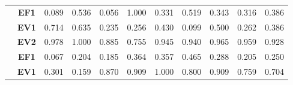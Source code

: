 \begin{table}[htbp]
\begin{tabular}{|cclllllllll|}
		\rowcolor[HTML]{F2F2F2} 
		\multicolumn{1}{|c|}{\cellcolor[HTML]{F2F2F2}} & \multicolumn{1}{c|}{\cellcolor[HTML]{F2F2F2}\textbf{EF1}} & \multicolumn{1}{l|}{\cellcolor[HTML]{F2F2F2}0.089} & \multicolumn{1}{l|}{\cellcolor[HTML]{F2F2F2}0.536} & \multicolumn{1}{l|}{\cellcolor[HTML]{F2F2F2}0.056} & \multicolumn{1}{l|}{\cellcolor[HTML]{F2F2F2}1.000} & \multicolumn{1}{l|}{\cellcolor[HTML]{F2F2F2}0.331} & \multicolumn{1}{l|}{\cellcolor[HTML]{F2F2F2}0.519} & \multicolumn{1}{l|}{\cellcolor[HTML]{F2F2F2}0.343} & \multicolumn{1}{l|}{\cellcolor[HTML]{F2F2F2}0.316} & 0.386 \\ \cline{2-11} 
		\multicolumn{1}{|c|}{\cellcolor[HTML]{F2F2F2}} & \multicolumn{1}{c|}{\textbf{EV1}} & \multicolumn{1}{l|}{0.714} & \multicolumn{1}{l|}{0.635} & \multicolumn{1}{l|}{0.235} & \multicolumn{1}{l|}{0.256} & \multicolumn{1}{l|}{0.430} & \multicolumn{1}{l|}{0.099} & \multicolumn{1}{l|}{0.500} & \multicolumn{1}{l|}{0.262} & 0.386 \\ \cline{2-11} 
		\rowcolor[HTML]{F2F2F2} 
		\multicolumn{1}{|c|}{\multirow{-3}{*}{\cellcolor[HTML]{F2F2F2}\textbf{B03}}} & \multicolumn{1}{c|}{\cellcolor[HTML]{F2F2F2}\textbf{EV2}} & \multicolumn{1}{l|}{\cellcolor[HTML]{F2F2F2}0.978} & \multicolumn{1}{l|}{\cellcolor[HTML]{F2F2F2}1.000} & \multicolumn{1}{l|}{\cellcolor[HTML]{F2F2F2}0.885} & \multicolumn{1}{l|}{\cellcolor[HTML]{F2F2F2}0.755} & \multicolumn{1}{l|}{\cellcolor[HTML]{F2F2F2}0.945} & \multicolumn{1}{l|}{\cellcolor[HTML]{F2F2F2}0.940} & \multicolumn{1}{l|}{\cellcolor[HTML]{F2F2F2}0.965} & \multicolumn{1}{l|}{\cellcolor[HTML]{F2F2F2}0.959} & 0.928 \\ \hline
		\multicolumn{1}{|c|}{\cellcolor[HTML]{F2F2F2}} & \multicolumn{1}{c|}{\textbf{EF1}} & \multicolumn{1}{l|}{0.067} & \multicolumn{1}{l|}{0.204} & \multicolumn{1}{l|}{0.185} & \multicolumn{1}{l|}{0.364} & \multicolumn{1}{l|}{0.357} & \multicolumn{1}{l|}{0.465} & \multicolumn{1}{l|}{0.288} & \multicolumn{1}{l|}{0.205} & 0.250 \\ \cline{2-11} 
		\rowcolor[HTML]{F2F2F2} 
		\multicolumn{1}{|c|}{\cellcolor[HTML]{F2F2F2}} & \multicolumn{1}{c|}{\cellcolor[HTML]{F2F2F2}\textbf{EV1}} & \multicolumn{1}{l|}{\cellcolor[HTML]{F2F2F2}0.301} & \multicolumn{1}{l|}{\cellcolor[HTML]{F2F2F2}0.159} & \multicolumn{1}{l|}{\cellcolor[HTML]{F2F2F2}0.870} & \multicolumn{1}{l|}{\cellcolor[HTML]{F2F2F2}0.909} & \multicolumn{1}{l|}{\cellcolor[HTML]{F2F2F2}1.000} & \multicolumn{1}{l|}{\cellcolor[HTML]{F2F2F2}0.800} & \multicolumn{1}{l|}{\cellcolor[HTML]{F2F2F2}0.909} & \multicolumn{1}{l|}{\cellcolor[HTML]{F2F2F2}0.759} & 0.704 \\ \cline{2-11} 

\end{tabular}
\end{table}
